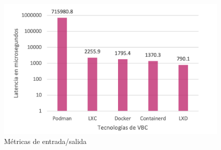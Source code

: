 \begin{figure}[H]
    \centering
    \includegraphics[scale=0.5] {tablas-images/cp4/io.png}
    \caption{Métricas de entrada/salida}\label{fig:tabla-metricas-io}
\end{figure}